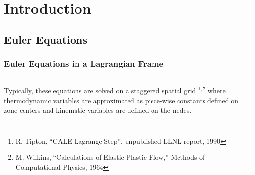 \documentclass[notes=hide,8pt,xcolor=svgnames]{beamer}
\begin{document}
\section{Introduction}
\subsection{Euler Equations}


\begin{frame}
  \frametitle{Euler Equations in a Lagrangian Frame}
\begin{columns}
\begin{column}{0.35\textwidth}
\small
Typically, these equations are solved on a staggered spatial grid \footnote[frame,1]{\tiny R. Tipton, ``CALE Lagrange Step”, unpublished LLNL report, 1990}$^,$\footnote[frame,2]{\tiny M. Wilkins, ``Calculations of Elastic-Plastic Flow,” Methods of Computational Physics, 1964}
where thermodynamic variables are approximated as piece-wise constants defined on zone centers and kinematic variables are defined on the nodes.


\end{column}
\end{columns}
\end{frame}
\end{document}
